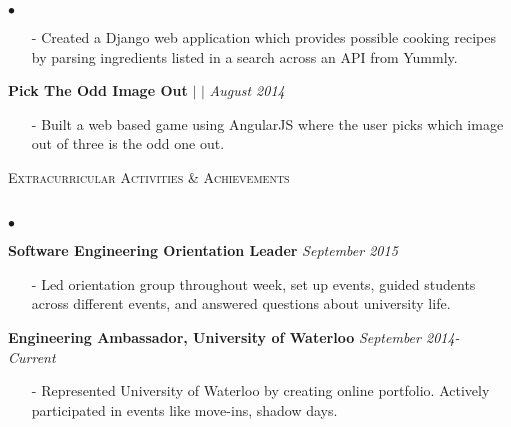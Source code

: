 \documentclass[10pt]{article}
\newcommand{\lineunder}{\vspace*{-8pt} \\ \hspace*{-18pt} \hrulefill \\}
\newcommand{\header}[1]{{\hspace*{-15pt}\vspace*{6pt} \textsc{#1}} \vspace*{-6pt} \lineunder }
\newenvironment{achievements}{\begin{list}{$\bullet$}{\topsep 0pt \itemsep -1.5pt \leftmargin 5pt}}{\vspace*{4pt}\end{list}}
\begin{document}
\begin{achievements}
\begin{itemize}
\item[-]Created a Django web application which provides possible cooking recipes by parsing ingredients listed in a search across an API from Yummly.
\end{itemize}
\item \textbf{Pick The Odd Image Out} $|$  \href{https://github.com/nakulpathak3/pick-odd-image-out}{\faGithub} $|$ \href{http://picktheoddimageout.bitballoon.com}{\faExternalLink}  \hfill \textit {August 2014}
\begin{itemize}
\item[-] Built a web based game using AngularJS where the user picks which image out of three is the odd one out. 
\end{itemize}
\end{achievements}

\vspace{8pt}

\header{\fontsize{11}{12}\selectfont Extracurricular Activities \& Achievements}
\begin{achievements}
\item \textbf{Software Engineering Orientation Leader} \hfill \textit {September 2015}
\begin{itemize}
\item[-] Led orientation group throughout week, set up events, guided students across different events, and answered questions about university life.
\end{itemize}
\vspace{2pt}
\item \textbf{Engineering Ambassador, University of Waterloo} \hfill \textit {September 2014- Current}
\begin{itemize}
\item[-] Represented University of Waterloo by creating online portfolio. Actively participated in events like move-ins, shadow days.
\end{itemize}
\end{achievements}
\end{document}
